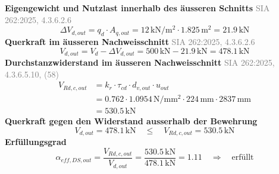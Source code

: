 \documentclass[11pt,a4paper]{article}
\newcommand{\normref}[1]{{\small\textcolor{gray}{#1}}}
\begin{document}
\noindent\textbf{Eigengewicht und Nutzlast innerhalb des äusseren Schnitts} \hfill \normref{SIA 262:2025, 4.3.6.2.6}
\begin{equation*}
\Delta V_{d,out} = q_d \cdot A_{q,out} = 12\,\mathrm{kN}/\mathrm{m}^{2} \cdot 1.825\,\mathrm{m}^{2} = 21.9\,\mathrm{kN}
\end{equation*}
\noindent\textbf{Querkraft im äusseren Nachweisschnitt} \hfill \normref{SIA 262:2025, 4.3.6.2.6}
\begin{equation*}
V_{d,out} = V_d - \Delta V_{d,out} = 500\,\mathrm{kN} - 21.9\,\mathrm{kN} = 478.1\,\mathrm{kN}
\end{equation*}
\noindent\textbf{Durchstanzwiderstand im äusseren Nachweisschnitt} \hfill \normref{SIA 262:2025, 4.3.6.5.10, (58)}
\begin{equation*}
\begin{aligned}
  V_{Rd,c,out} &= k_r \cdot \tau_{cd} \cdot d_{v,out} \cdot u_{out} \\
  &= 0.762 \cdot 1.0954\,\mathrm{N}/\mathrm{mm}^{2} \cdot 224\,\mathrm{mm} \cdot 2837\,\mathrm{mm} \\
  &= 530.5\,\mathrm{kN}
\end{aligned}
\end{equation*}
\noindent\textbf{Querkraft gegen den Widerstand ausserhalb der Bewehrung}
\begin{equation*}
V_{d,out} = 478.1\,\mathrm{kN} \quad \le \quad V_{Rd,c,out} = 530.5\,\mathrm{kN}
\end{equation*}
\noindent\textbf{Erfüllungsgrad}
\begin{equation*}
\alpha_{eff,DS,out} = \frac{V_{Rd,c,out}}{V_{d,out}} = \frac{530.5\,\mathrm{kN}}{478.1\,\mathrm{kN}} = 1.11 \quad \Rightarrow \quad \text{erfüllt}
\end{equation*}
\end{document}
